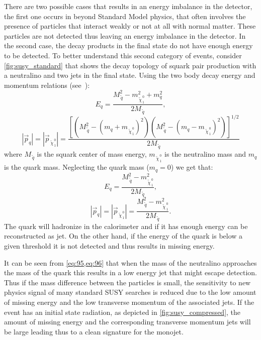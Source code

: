 There are two possible cases that results in an energy imbalance in the
detector, the first one occurs in beyond Standard Model physics, that often
involves the presence of particles that interact weakly or not at all with
normal matter. These particles are not detected thus leaving an energy imbalance
in the detector. In the second case, the decay products in the final state do
not have enough energy to be detected. To better understand this second category
of events, consider \cref{fig:susy_standard} that shows the decay topology of
squark pair production with a neutralino and two jets in the final state. Using
the two body decay energy and momentum relations (see~\cite{PDG}):
\begin{equation}
  \label{eq:93}
  E_q = \frac{M_{\, \tilde{q}}^2 - m_{\, \tilde{\chi}_{\, 1}^{\, 0}}^2 + m_q^2}{2
    M_{\, \tilde{q}}},
\end{equation}
\begin{equation}
  \label{eq:94}
  |\vec{p}_q| = |\vec{p}_{\, \tilde{\chi}_{\, 1}^{\, 0}}| = \frac{\left[ \left(
        M_{\, \tilde{q}}^2 - (m_q + m_{\, \tilde{\chi}_{\, 1}^{\, 0}})^2
      \right) \left( M_{\, \tilde{q}}^2 - (m_q - m_{\, \tilde{\chi}_{\, 1}^{\,
            0}})^2 \right) \right]^{1/2}}{2 M_{\, \tilde{q}}}
\end{equation}
where $M_{\, \tilde{q}}$ is the squark center of mass energy,
$m_{\, \tilde{\chi}_{\, 1}^{\, 0}}$ is the neutralino mass and $m_q$ is the
quark mass. Neglecting the quark mass ($m_q = 0$) we get that:
\begin{equation}
  \label{eq:95}
  E_q = \frac{M_{\, \tilde{q}}^2 - m_{\, \tilde{\chi}_{\, 1}^{\, 0}}^2}{2 M_{\,
      \tilde{q}}},
\end{equation}
\begin{equation}
  \label{eq:96}
  |\vec{p}_q| = |\vec{p}_{\, \tilde{\chi}_{\, 1}^{\, 0}}| = \frac{M_{\,
      \tilde{q}}^2 - m_{\, \tilde{\chi}_{\, 1}^{\, 0}}^2}{2 M_{\, \tilde{q}}}.
\end{equation}
The quark will hadronize in the calorimeter and if it has enough energy can be
reconstructed as jet. On the other hand, if the energy of the quark is below a
given threshold it is not detected and thus results in missing energy.

It can be seen from \cref{eq:95,eq:96} that when the mass of the neutralino
approaches the mass of the quark this results in a low energy jet that might
escape detection. Thus if the mass difference between the particles is small,
the sensitivity to new physics signal of many standard SUSY searches is reduced
due to the low amount of missing energy and the low transverse momentum of the
associated jets. If the event has an initial state radiation, as depicted in
\cref{fig:susy_compressed}, the amount of missing energy and the corresponding
transverse momentum jets will be large leading thus to a clean signature for the
monojet.

